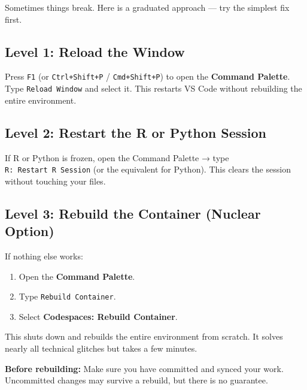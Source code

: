 \documentclass[
  letterpaper,
  DIV=11,
  numbers=noendperiod,
  oneside]{scrreprt}
\providecommand{\tightlist}{%
  \setlength{\itemsep}{0pt}\setlength{\parskip}{0pt}}
\begin{document}

Sometimes things break. Here is a graduated approach --- try the
simplest fix first.

\subsection*{Level 1: Reload the
Window}\label{level-1-reload-the-window}

Press \texttt{F1} (or \texttt{Ctrl+Shift+P} / \texttt{Cmd+Shift+P}) to
open the \textbf{Command Palette}. Type \texttt{Reload\ Window} and
select it. This restarts VS Code without rebuilding the entire
environment.

\subsection*{Level 2: Restart the R or Python
Session}\label{level-2-restart-the-r-or-python-session}

If R or Python is frozen, open the Command Palette → type
\texttt{R:\ Restart\ R\ Session} (or the equivalent for Python). This
clears the session without touching your files.

\subsection*{Level 3: Rebuild the Container (Nuclear
Option)}\label{level-3-rebuild-the-container-nuclear-option}

If nothing else works:

\begin{enumerate}
\def\labelenumi{\arabic{enumi}.}
\tightlist
\item
  Open the \textbf{Command Palette}.
\item
  Type \texttt{Rebuild\ Container}.
\item
  Select \textbf{Codespaces: Rebuild Container}.
\end{enumerate}

This shuts down and rebuilds the entire environment from scratch. It
solves nearly all technical glitches but takes a few minutes.

\begin{tcolorbox}[enhanced jigsaw, opacitybacktitle=0.6, colbacktitle=quarto-callout-warning-color!10!white, breakable, opacityback=0, coltitle=black, toptitle=1mm, bottomrule=.15mm, colframe=quarto-callout-warning-color-frame, bottomtitle=1mm, colback=white, leftrule=.75mm, rightrule=.15mm, title=\textcolor{quarto-callout-warning-color}{\faExclamationTriangle}\hspace{0.5em}{Warning}, left=2mm, arc=.35mm, toprule=.15mm, titlerule=0mm]

\textbf{Before rebuilding:} Make sure you have committed and synced your
work. Uncommitted changes may survive a rebuild, but there is no
guarantee.

\end{tcolorbox}
\end{document}

